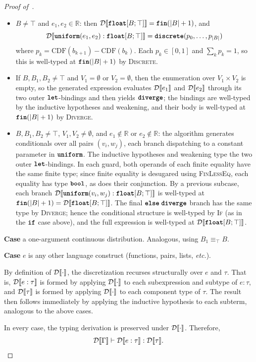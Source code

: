 \begin{proof}[Proof of~]
\begin{itemize}[leftmargin=1.5em, itemsep=0.5em, topsep=0.35em]
      \item $B \neq \top$ and $e_1, e_2 \in \mathbb{R}$: then $\mathcal{D}\llbracket \textnormal{\ttfamily\bfseries float}[B;\top] \rrbracket = \textnormal{\ttfamily\bfseries fin}(|B|+1)$, and
      \[
          \mathcal{D}\llbracket \textnormal{\ttfamily\bfseries uniform}(e_1, e_2) : \textnormal{\ttfamily\bfseries float}[B;\top] \rrbracket = \textnormal{\ttfamily\bfseries discrete}(p_0, \ldots, p_{|B|})
      \]
      where $p_k = \mathrm{CDF}(b_{k+1}) - \mathrm{CDF}(b_k)$. Each $p_k \in [0,1]$ and $\sum_k p_k = 1$, so this is well-typed at $\textnormal{\ttfamily\bfseries fin}(|B|+1)$ by \textsc{Discrete}.
  
      \item If $B,B_1,B_2 \neq \top$ and $V_1=\emptyset$ or $V_2=\emptyset$, then the enumeration over $V_1\times V_2$ is empty, so the generated expression evaluates $\mathcal{D}\llbracket e_1 \rrbracket$ and $\mathcal{D}\llbracket e_2 \rrbracket$ through its two outer $\textnormal{\ttfamily\bfseries let}$-bindings and then yields $\textnormal{\ttfamily\bfseries diverge}$; the bindings are well-typed by the inductive hypotheses and weakening, and their body is well-typed at $\textnormal{\ttfamily\bfseries fin}(|B|+1)$ by \textsc{Diverge}.

      \item $B,B_1,B_2 \neq \top$, $V_1,V_2\neq\emptyset$, and
      $e_1\notin\mathbb{R}$ or $e_2\notin\mathbb{R}$: the algorithm generates conditionals over all pairs $(v_i, w_j)$, each branch dispatching to a constant parameter in $\textnormal{\ttfamily\bfseries uniform}$. The inductive hypotheses and weakening type the two outer $\textnormal{\ttfamily\bfseries let}$-bindings. In each guard, both operands of each finite equality have the same finite type; since finite equality is desugared using \textsc{FinLessEq}, each equality has type $\textnormal{\ttfamily\bfseries bool}$, as does their conjunction. By a previous subcase, each branch $\mathcal{D}\llbracket \textnormal{\ttfamily\bfseries uniform}(v_i, w_j) : \textnormal{\ttfamily\bfseries float}[B;\top] \rrbracket$ is well-typed at $\textnormal{\ttfamily\bfseries fin}(|B|+1) = \mathcal{D}\llbracket \textnormal{\ttfamily\bfseries float}[B;\top] \rrbracket$. The final $\textnormal{\ttfamily\bfseries else}\;\textnormal{\ttfamily\bfseries diverge}$ branch has the same type by \textsc{Diverge}; hence the conditional structure is well-typed by \textsc{If} (as in the $\textnormal{\ttfamily\bfseries if}$ case above), and the full expression is well-typed at $\mathcal{D}\llbracket \textnormal{\ttfamily\bfseries float}[B;\top] \rrbracket$.
  \end{itemize}

  \par\medskip\noindent
  \textbf{Case} a one-argument continuous distribution. Analogous, using $B_1 \equiv_{\top} B$.

  \par\medskip\noindent
  \textbf{Case} $e$ is any other language construct (functions, pairs, lists, \emph{etc.}).
  \par\nopagebreak
  By definition of $\mathcal{D}\llbracket \cdot \rrbracket$, the discretization recurses structurally over $e$ and $\tau$. That is, $\mathcal{D}\llbracket e : \tau \rrbracket$ is formed by applying $\mathcal{D}\llbracket \cdot \rrbracket$ to each subexpression and subtype of $e : \tau$, and $\mathcal{D}\llbracket \tau \rrbracket$ is formed by applying $\mathcal{D}\llbracket \cdot \rrbracket$ to each component type of $\tau$. The result then follows immediately by applying the inductive hypothesis to each subterm, analogous to the above cases.

  \par\medskip\noindent
  In every case, the typing derivation is preserved under $\mathcal{D}\llbracket \cdot \rrbracket$. Therefore,
  \[
      \mathcal{D}\llbracket \Gamma \rrbracket \vdash \mathcal{D}\llbracket e : \tau \rrbracket : \mathcal{D}\llbracket \tau \rrbracket. \qedhere
  \]
\end{proof}

